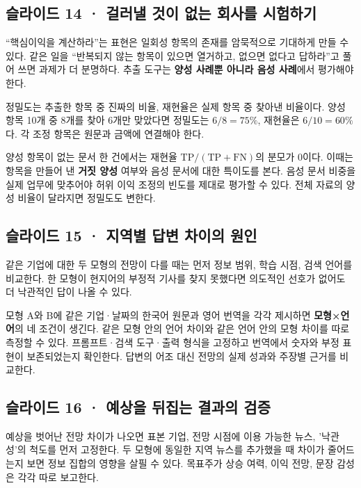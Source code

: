 \documentclass[11pt,a4paper]{article}
\begin{document}
\subsection{슬라이드 14 · 걸러낼 것이 없는 회사를 시험하기}
“핵심이익을 계산하라”는 표현은 일회성 항목의 존재를 암묵적으로 기대하게 만들 수 있다. 같은 일을 “반복되지 않는 항목이 있으면 열거하고, 없으면 없다고 답하라”고 풀어 쓰면 과제가 더 분명하다. 추출 도구는 \textbf{양성 사례뿐 아니라 음성 사례}에서 평가해야 한다.\par

정밀도는 추출한 항목 중 진짜의 비율, 재현율은 실제 항목 중 찾아낸 비율이다. 양성 항목 10개 중 8개를 찾아 6개만 맞았다면 정밀도는 $6/8=75\%$, 재현율은 $6/10=60\%$다. 각 조정 항목은 원문과 금액에 연결해야 한다.\par

양성 항목이 없는 문서 한 건에서는 재현율 $\mathrm{TP}/(\mathrm{TP}+\mathrm{FN})$의 분모가 0이다. 이때는 항목을 만들어 낸 \textbf{거짓 양성} 여부와 음성 문서에 대한 특이도를 본다. 음성 문서 비중을 실제 업무에 맞추어야 허위 이익 조정의 빈도를 제대로 평가할 수 있다. 전체 자료의 양성 비율이 달라지면 정밀도도 변한다.\par

\subsection{슬라이드 15 · 지역별 답변 차이의 원인}
같은 기업에 대한 두 모형의 전망이 다를 때는 먼저 정보 범위, 학습 시점, 검색 언어를 비교한다. 한 모형이 현지어의 부정적 기사를 찾지 못했다면 의도적인 선호가 없어도 더 낙관적인 답이 나올 수 있다.\par

모형 A와 B에 같은 기업·날짜의 한국어 원문과 영어 번역을 각각 제시하면 \textbf{모형×언어}의 네 조건이 생긴다. 같은 모형 안의 언어 차이와 같은 언어 안의 모형 차이를 따로 측정할 수 있다. 프롬프트·검색 도구·출력 형식을 고정하고 번역에서 숫자와 부정 표현이 보존되었는지 확인한다. 답변의 어조 대신 전망의 실제 성과와 주장별 근거를 비교한다.\par

\subsection{슬라이드 16 · 예상을 뒤집는 결과의 검증}
예상을 벗어난 전망 차이가 나오면 표본 기업, 전망 시점에 이용 가능한 뉴스, '낙관성'의 척도를 먼저 고정한다. 두 모형에 동일한 지역 뉴스를 추가했을 때 차이가 줄어드는지 보면 정보 집합의 영향을 살필 수 있다. 목표주가 상승 여력, 이익 전망, 문장 감성은 각각 따로 보고한다.\par
\end{document}
